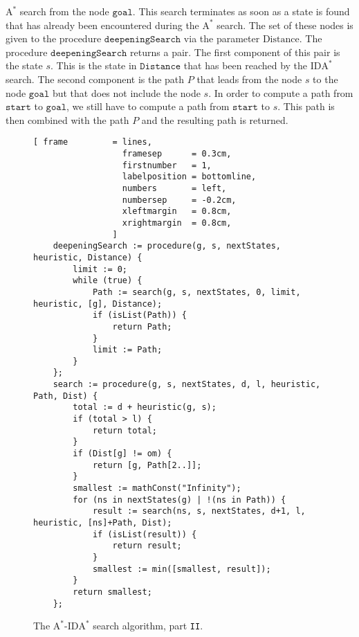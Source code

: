 \begin{enumerate}
      $\mathrm{A}^*$ search from the node $\mathtt{goal}$.  This search terminates as soon as a state is found
      that has already been encountered during the $\mathrm{A}^*$ search.  The set of these nodes is given to
      the procedure $\mathtt{deepeningSearch}$ via the parameter $\mathrm{Distance}$.  The procedure
      $\mathtt{deepeningSearch}$ returns a pair.  The first component of this pair is the state $s$.  This is
      the state in $\mathtt{Distance}$ that has been reached by the $\mathrm{IDA}^*$ search.  The second component is the
      path $P$ that leads from the node $s$ to the node $\mathtt{goal}$ but that does not include the node $s$.
      In order to compute a path from $\mathtt{start}$ to $\mathtt{goal}$, we still have to compute a
      path from $\mathtt{start}$ to $s$.  This path is then combined with the path $P$ and the resulting path
      is returned.
\end{enumerate}


\begin{figure}[!ht]
\centering
\begin{Verbatim}[ frame         = lines, 
                  framesep      = 0.3cm, 
                  firstnumber   = 1,
                  labelposition = bottomline,
                  numbers       = left,
                  numbersep     = -0.2cm,
                  xleftmargin   = 0.8cm,
                  xrightmargin  = 0.8cm,
                ]
    deepeningSearch := procedure(g, s, nextStates, heuristic, Distance) {
        limit := 0;
        while (true) {
            Path := search(g, s, nextStates, 0, limit, heuristic, [g], Distance);
            if (isList(Path)) {
                return Path;
            }
            limit := Path;
        }
    };
    search := procedure(g, s, nextStates, d, l, heuristic, Path, Dist) {
        total := d + heuristic(g, s);
        if (total > l) {
            return total;
        }
        if (Dist[g] != om) {
            return [g, Path[2..]];
        }
        smallest := mathConst("Infinity");
        for (ns in nextStates(g) | !(ns in Path)) {
            result := search(ns, s, nextStates, d+1, l, heuristic, [ns]+Path, Dist);
            if (isList(result)) {
                return result;
            }
            smallest := min([smallest, result]);
        }
        return smallest;
    };
\end{Verbatim}
\vspace*{-0.3cm}
\caption{The $\mathrm{A}^*$-$\mathrm{IDA}^*$ search algorithm, part \texttt{II}.}
\label{fig:a-star-ida-star.stlx-2}
\end{figure}

